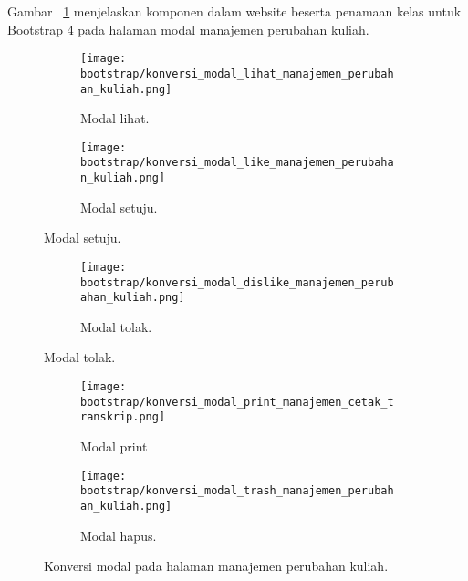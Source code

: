 \noindent Gambar ~\ref{fig:konversiModalManajemenPerubahanKuliah} menjelaskan komponen dalam website beserta penamaan kelas untuk Bootstrap 4 pada halaman modal manajemen perubahan kuliah.\\
\begin{figure}[H]
	\centering
	\begin{subfigure}[b]{0.45\linewidth} 
		\texttt{[image: bootstrap/konversi\_modal\_lihat\_manajemen\_perubahan\_kuliah.png]}
		\caption{Modal lihat.}
	\end{subfigure}	
	\begin{subfigure}[b]{0.45\linewidth} 
		\texttt{[image: bootstrap/konversi\_modal\_like\_manajemen\_perubahan\_kuliah.png]}
		\caption{Modal setuju.}
	\end{subfigure}
\end{figure}
\begin{figure}[H]	
	\centering
	\ContinuedFloat
	\begin{subfigure}[b]{0.45\linewidth}  
		\texttt{[image: bootstrap/konversi\_modal\_dislike\_manajemen\_perubahan\_kuliah.png]}
		\caption{Modal tolak.}
	\end{subfigure}
\end{figure}

\begin{figure}[H] 
	\centering
	\ContinuedFloat
	\begin{subfigure}[b]{0.45\linewidth}  
		\texttt{[image: bootstrap/konversi\_modal\_print\_manajemen\_cetak\_transkrip.png]}
		\caption{Modal print}
	\end{subfigure}	
	\begin{subfigure}[b]{0.45\linewidth}   
		\texttt{[image: bootstrap/konversi\_modal\_trash\_manajemen\_perubahan\_kuliah.png]}
		\caption{Modal hapus.}
	\end{subfigure}
	\caption{Konversi modal pada halaman manajemen perubahan kuliah.}
	\label{fig:konversiModalManajemenPerubahanKuliah}
\end{figure}

